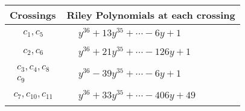 \documentclass[1p]{elsarticle_modified}
\theoremstyle{definition}
\begin{document}
\begin{tabular}{m{50pt}|m{274pt}}
Crossings & \hspace{64pt}Riley Polynomials at each crossing \\
\hline $$\begin{aligned}c_{1},c_{5}\end{aligned}$$&$\begin{aligned}
&y^{36}+13 y^{35}+\cdots-6 y+1
\end{aligned}$\\
\hline $$\begin{aligned}c_{2},c_{6}\end{aligned}$$&$\begin{aligned}
&y^{36}+21 y^{35}+\cdots-126 y+1
\end{aligned}$\\
\hline $$\begin{aligned}c_{3},c_{4},c_{8}\\c_{9}\end{aligned}$$&$\begin{aligned}
&y^{36}-39 y^{35}+\cdots-6 y+1
\end{aligned}$\\
\hline $$\begin{aligned}c_{7},c_{10},c_{11}\end{aligned}$$&$\begin{aligned}
&y^{36}+33 y^{35}+\cdots-406 y+49
\end{aligned}$\\
\hline
\end{tabular}
\vskip 2pc
\end{document}
